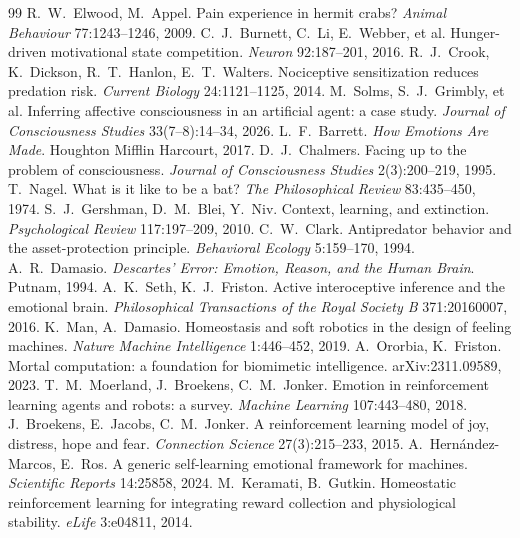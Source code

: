 \documentclass[11pt]{article}
\begin{document}
\begin{thebibliography}{99}
 R.~W.~Elwood, M.~Appel. Pain experience in hermit crabs? \emph{Animal Behaviour} 77:1243--1246, 2009.
 C.~J.~Burnett, C.~Li, E.~Webber, et al. Hunger-driven motivational state competition. \emph{Neuron} 92:187--201, 2016.
 R.~J.~Crook, K.~Dickson, R.~T.~Hanlon, E.~T.~Walters. Nociceptive sensitization reduces predation risk. \emph{Current Biology} 24:1121--1125, 2014.
 M.~Solms, S.~J.~Grimbly, et al. Inferring affective consciousness in an artificial agent: a case study. \emph{Journal of Consciousness Studies} 33(7--8):14--34, 2026.
 L.~F.~Barrett. \emph{How Emotions Are Made}. Houghton Mifflin Harcourt, 2017.
 D.~J.~Chalmers. Facing up to the problem of consciousness. \emph{Journal of Consciousness Studies} 2(3):200--219, 1995.
 T.~Nagel. What is it like to be a bat? \emph{The Philosophical Review} 83:435--450, 1974.
 S.~J.~Gershman, D.~M.~Blei, Y.~Niv. Context, learning, and extinction. \emph{Psychological Review} 117:197--209, 2010.
 C.~W.~Clark. Antipredator behavior and the asset-protection principle. \emph{Behavioral Ecology} 5:159--170, 1994.
 A.~R.~Damasio. \emph{Descartes' Error: Emotion, Reason, and the Human Brain}. Putnam, 1994.
 A.~K.~Seth, K.~J.~Friston. Active interoceptive inference and the emotional brain. \emph{Philosophical Transactions of the Royal Society B} 371:20160007, 2016.
 K.~Man, A.~Damasio. Homeostasis and soft robotics in the design of feeling machines. \emph{Nature Machine Intelligence} 1:446--452, 2019.
 A.~Ororbia, K.~Friston. Mortal computation: a foundation for biomimetic intelligence. arXiv:2311.09589, 2023.
 T.~M.~Moerland, J.~Broekens, C.~M.~Jonker. Emotion in reinforcement learning agents and robots: a survey. \emph{Machine Learning} 107:443--480, 2018.
 J.~Broekens, E.~Jacobs, C.~M.~Jonker. A reinforcement learning model of joy, distress, hope and fear. \emph{Connection Science} 27(3):215--233, 2015.
 A.~Hern\'andez-Marcos, E.~Ros. A generic self-learning emotional framework for machines. \emph{Scientific Reports} 14:25858, 2024.
 M.~Keramati, B.~Gutkin. Homeostatic reinforcement learning for integrating reward collection and physiological stability. \emph{eLife} 3:e04811, 2014.

\end{thebibliography}
\end{document}
